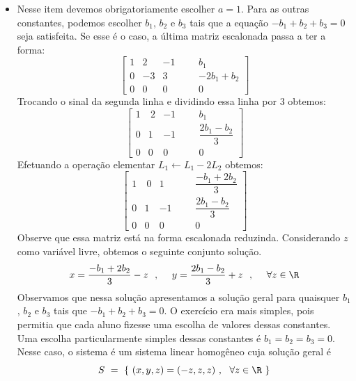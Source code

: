 \begin{solution}
\begin{itemize}
\item[(d)] Nesse item devemos obrigatoriamente escolher $a=1$. Para as outras constantes, podemos escolher $b_1$, $b_2$ e $b_3$ tais que a equação $-b_1+b_2+b_3 = 0$ seja satisfeita. Se esse é o caso, a última matriz escalonada passa a ter a forma:
$$ \left[\begin{array}{rrrr|rc}
  1 &   2 &  -1   & & &   b_1             \\
  0 &  -3 &   3   & & &   -2b_1 + b_2     \\ 
  0 &   0 &   0   & & &   0               \end{array}\right] $$
Trocando o sinal da segunda linha e dividindo essa linha por 3 obtemos:
$$ \left[\begin{array}{rrrr|rc}
  1 & \ 2 &  -1   & & &   b_1                      \\[8pt]
  0 &   1 &  -1   & & &   \dfrac{2b_1 - b_2}{3}    \\[10pt]
  0 &   0 &   0   & & &   0                         \end{array}\right] $$
Efetuando a operação elementar $L_1 \leftarrow L_1 - 2L_2$ obtemos:
$$ \left[\begin{array}{rrrr|rc}
  1 & \ 0 &   1   & & &   \dfrac{-b_1 + 2b_2}{3}   \\[10pt]
  0 &   1 &  -1   & & &   \dfrac{2b_1 - b_2}{3}    \\[10pt] 
  0 &   0 &   0   & & &   0                         \end{array}\right] $$
Observe que essa matriz está na forma escalonada reduzinda. Considerando $z$ como variável livre, obtemos o seguinte conjunto solução.
$$x = \dfrac{-b_1 + 2b_2}{3} - z \ \ , \ \ \ \ y = \dfrac{2b_1 - b_2}{3} + z \ \ , \ \ \ \ \forall z \in \R $$
Observamos que nessa solução apresentamos a solução geral para quaisquer $b_1$, $b_2$ e $b_3$ tais que
$-b_1 + b_2 + b_3 = 0$. O exercício era mais simples, pois permitia que cada aluno fizesse uma escolha de valores dessas constantes. 
Uma escolha particularmente simples dessas constantes é $b_1=b_2=b_3=0$. Nesse caso, o sistema é um sistema linear homogêneo cuja solução geral é 
$$S\ =\ \{\ (x,y,z) = (-z,z,z) \ , \ \ \forall z \in \R \ \}$$
\end{itemize}
\end{solution}

